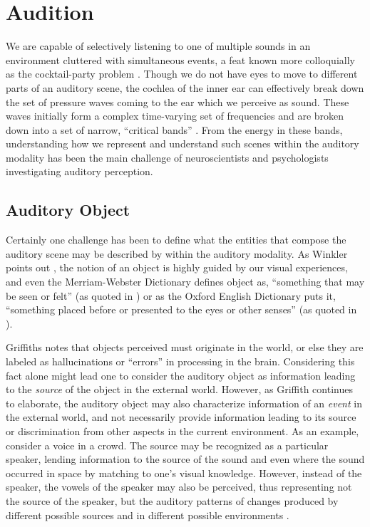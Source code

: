 \section{Audition}

We are capable of selectively listening to one of multiple sounds in an environment cluttered with simultaneous events, a feat known more colloquially as the cocktail-party problem \cite{McDermott2009}.  Though we do not have eyes to move to different parts of an auditory scene, the cochlea of the inner ear can effectively break down the set of pressure waves coming to the ear which we perceive as sound.  These waves initially form a complex time-varying set of frequencies and are broken down into a set of narrow, ``critical bands'' \cite{Fletcher1940}.  From the energy in these bands, understanding how we represent and understand such scenes within the auditory modality has been the main challenge of neuroscientists and psychologists investigating auditory perception.  

\subsection{Auditory Object}

Certainly one challenge has been to define what the entities that compose the auditory scene may be described by within the auditory modality.  As Winkler points out \cite{Ist2010}, the notion of an object is highly guided by our visual experiences, and even the Merriam-Webster Dictionary defines object as, ``something that may be seen or felt'' (as quoted in \cite{Ist2010}) or as the Oxford English Dictionary puts it, ``something placed before or presented to the eyes or other senses'' (as quoted in \cite{Griffiths2004}).  

Griffiths notes that objects perceived must originate in the world, or else they are labeled as hallucinations or ``errors'' in processing in the brain.  Considering this fact alone might lead one to consider the auditory object as information leading to the \textit{source} of the object in the external world.  However, as Griffith continues to elaborate, the auditory object may also characterize information of an \textit{event} in the external world, and not necessarily provide information leading to its source or discrimination from other aspects in the current environment.  As an example, consider a voice in a crowd.  The source may be recognized as a particular speaker, lending information to the source of the sound and even where the sound occurred in space by matching to one's visual knowledge.  However, instead of the speaker, the vowels of the speaker may also be perceived, thus representing not the source of the speaker, but the auditory patterns of changes produced by different possible sources and in different possible environments \cite{Griffiths2004}.  

